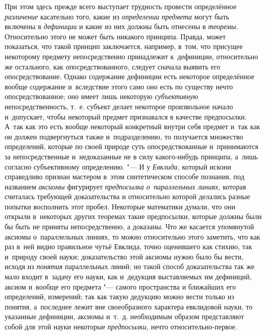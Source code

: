 При этом здесь прежде всего выступает трудность провести
определённое {\em различение}
касательно того, какие из
{\em определении
}{\em предмета} могут
быть включены в {\em дефиниции}
и какие из них должны быть отнесены в
{\em теоремы}.
Относительно этого не может быть никакого принципа. Правда,
может показаться, что такой принцип заключается, например, в~том, что
присущее некоторому предмету непосредственно принадлежит к~дефиниции,
относительно же остального, как опосредствованного, следует сначала выявить
его опосредствование. Однако содержание дефиниции есть некоторое
определённое вообще содержание и~вследствие этого само оно есть по существу
нечто опосредствованное; оно имеет лишь некоторую
{\em субъективную}
непосредственность, т.~е. субъект делает некоторое
произвольное начало и~допускает, чтобы некоторый предмет признавался в
качестве предпосылки. А~так как это есть вообще некоторый конкретный внутри
себя предмет и~так как он должен подвергнуться также и~подразделению, то
получается множество определений, которые по своей природе суть
опосредствованные и~принимаются за непосредственные и~недоказанные не в
силу какого-нибудь принципа, а~лишь согласно субъективному определению. "---
И у {\em Евклида,}
который искони справедливо признан мастером в~этом
синтетическом способе познания, под названием
{\em аксиомы} фигурирует
{\em предпосылка о~параллельных
линиях,} которая считалась требующей доказательства и
относительно которой делались разные попытки восполнить этот пробел.
Некоторые математики думали, что они открыли в~некоторых других теоремах
такие предпосылки, которые должны были бы быть не приняты непосредственно,
а доказаны. Что же касается упомянутой аксиомы о~параллельных линиях, то
можно относительно этого заметить, что как раз в~ней видно правильное чутьё
Евклида, точно оценившего как стихию, так и~природу своей науки;
доказательство этой аксиомы нужно было бы вести, исходя из
{\em понятия}
параллельных линий; но такой способ доказательства так же
мало входит в~задачу его науки, как и~дедукция выставляемых им дефиниций,
аксиом и~вообще его предмета "--- самого пространства и
ближайших его определений, измерений; так как такую дедукцию можно вести
только из понятия, а~последнее лежит вне своеобразного характера евклидовой
науки, то указанные дефиниции, аксиомы и~т.~д. необходимым образом
представляют собой для этой науки некоторые
{\em предпосылки,} нечто
относительно-первое.

